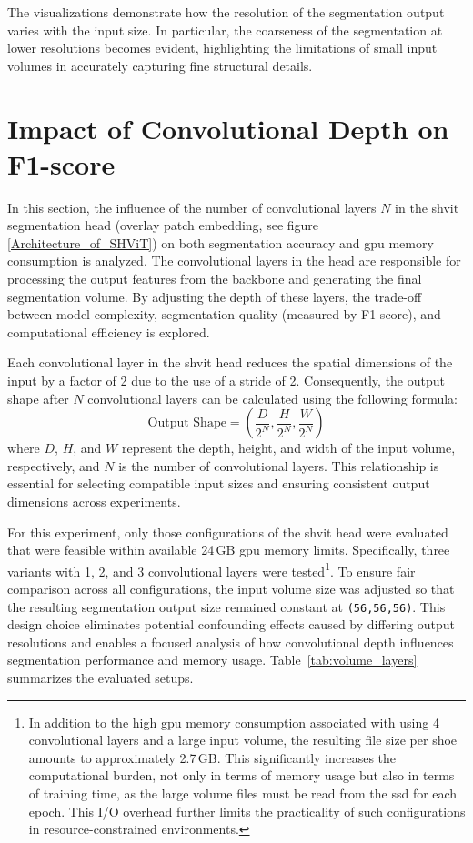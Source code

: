 The visualizations demonstrate how the resolution of the segmentation output varies with the input size. In particular, the coarseness of the segmentation at lower resolutions becomes evident, highlighting the limitations of small input volumes in accurately capturing fine structural details.


\section{Impact of Convolutional Depth on F1-score}
In this section, the influence of the number of convolutional layers $N$ in the \gls{shvit} segmentation head (overlay patch embedding, see figure \ref{Architecture_of_SHViT}) on both segmentation accuracy and \acrshort{gpu} memory consumption is analyzed. The convolutional layers in the head are responsible for processing the output features from the backbone and generating the final segmentation volume. By adjusting the depth of these layers, the trade-off between model complexity, segmentation quality (measured by F1-score), and computational efficiency is explored. 

\medskip

Each convolutional layer in the \gls{shvit} head reduces the spatial dimensions of the input by a factor of 2 due to the use of a stride of 2. Consequently, the output shape after $N$ convolutional layers can be calculated using the following formula:
\begin{equation}
\text{Output Shape} = \left(\frac{D}{2^N},\frac{H}{2^N},\frac{W}{2^N}\right)
\end{equation}
where $D$, $H$, and $W$ represent the depth, height, and width of the input volume, respectively, and $N$ is the number of convolutional layers. This relationship is essential for selecting compatible input sizes and ensuring consistent output dimensions across experiments.

\medskip

For this experiment, only those configurations of the \gls{shvit} head were evaluated that were feasible within available 24\,GB \acrshort{gpu} memory limits. Specifically, three variants with 1, 2, and 3 convolutional layers were tested\footnote{In addition to the high \acrshort{gpu} memory consumption associated with using 4 convolutional layers and a large input volume, the resulting file size per shoe amounts to approximately 2.7\,GB. This significantly increases the computational burden, not only in terms of memory usage but also in terms of training time, as the large volume files must be read from the \acrshort{ssd} for each epoch. This I/O overhead further limits the practicality of such configurations in resource-constrained environments.}. To ensure fair comparison across all configurations, the input volume size was adjusted so that the resulting segmentation output size remained constant at {\tt (56,56,56)}. This design choice eliminates potential confounding effects caused by differing output resolutions and enables a focused analysis of how convolutional depth influences segmentation performance and memory usage. Table~\ref{tab:volume_layers} summarizes the evaluated setups.

